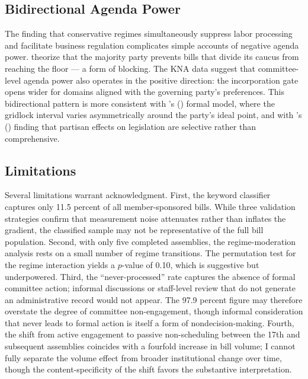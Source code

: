 \documentclass[11pt]{article}
\begin{document}
\subsection{Bidirectional Agenda Power}

The finding that conservative regimes simultaneously suppress labor processing and facilitate business regulation complicates simple accounts of negative agenda power. \citet{cox2005} theorize that the majority party prevents bills that divide its caucus from reaching the floor --- a form of blocking. The KNA data suggest that committee-level agenda power also operates in the positive direction: the incorporation gate opens wider for domains aligned with the governing party's preferences. This bidirectional pattern is more consistent with \citeauthor{crosson2018}'s (\citeyear{crosson2018}) formal model, where the gridlock interval varies asymmetrically around the party's ideal point, and with \citeauthor{curry2019}'s (\citeyear{curry2019}) finding that partisan effects on legislation are selective rather than comprehensive.

\subsection{Limitations}

Several limitations warrant acknowledgment. First, the keyword classifier captures only 11.5 percent of all member-sponsored bills. While three validation strategies confirm that measurement noise attenuates rather than inflates the gradient, the classified sample may not be representative of the full bill population. Second, with only five completed assemblies, the regime-moderation analysis rests on a small number of regime transitions. The permutation test for the regime interaction yields a $p$-value of 0.10, which is suggestive but underpowered. Third, the ``never-processed'' rate captures the absence of formal committee action; informal discussions or staff-level review that do not generate an administrative record would not appear. The 97.9 percent figure may therefore overstate the degree of committee non-engagement, though informal consideration that never leads to formal action is itself a form of nondecision-making. Fourth, the shift from active engagement to passive non-scheduling between the 17th and subsequent assemblies coincides with a fourfold increase in bill volume; I cannot fully separate the volume effect from broader institutional change over time, though the content-specificity of the shift favors the substantive interpretation.
\end{document}
